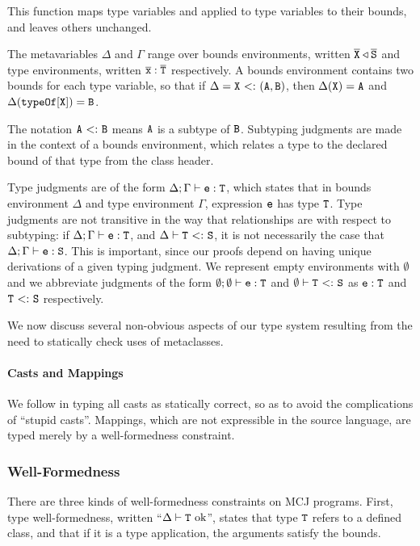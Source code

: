 \documentclass{acm-sigplan}
\begin{document}
This function maps type variables and {} applied to type
variables to their bounds, and leaves others unchanged.

The metavariables $\Delta$ and $\Gamma$ range over bounds
environments, written ${\overline{{\mbox {\tt X}}}} \triangleleft {\overline{{\mbox {\tt S}}}}$ and type environments,
written ${{\overline{{\mbox {\tt x}}}}} : {{\overline{{\mathtt{{T}}}}}}$ respectively.  A bounds environment contains
two bounds for each type variable, so that if $\Delta = \mbox {\tt X} {\ <:\ }
(\mbox {\tt A},\mbox {\tt B})$, then $\Delta(\mbox {\tt X}) = \mbox {\tt A}$ and $\Delta({\mathtt{{typeOf}}\mathtt{{[}}\mbox {\tt X}\mathtt{{]}}}) = \mbox {\tt B}$.

The notation $\mbox {\tt A} {\ <:\ } \mbox {\tt B}$ means $\mbox {\tt A}$ is a subtype of $\mbox {\tt B}$.
Subtyping judgments are made in the context of a bounds environment,
which relates a type to the declared bound of that type from the class
header.

Type judgments are of the form ${\Delta;\Gamma} \vdash {\ensuremath{{\mbox {\tt e}} : {\mathtt{{T}}}}}$, which states
that in bounds environment $\Delta$ and type environment $\Gamma$,
expression $\mbox {\tt e}$ has type $\mathtt{{T}}$.  Type judgments are not transitive in
the way that {} relationships are with respect to
subtyping: if ${\Delta;\Gamma} \vdash {\ensuremath{{\mbox {\tt e}} : {\mathtt{{T}}}}}$, and ${\Delta} \vdash {\ensuremath{{\mathtt{{T}}} {\ <:\ } {\mbox {\tt S}}}}$, it is not necessarily the case that ${\Delta;\Gamma} \vdash {\ensuremath{{\mbox {\tt e}} : {\mbox {\tt S}}}}$.
This is important, since our proofs depend on having unique
derivations of a given typing judgment. We represent empty
environments with $\emptyset$ and we abbreviate judgments of the form
${\emptyset;\emptyset} \vdash {\ensuremath {{\mbox {\tt e}} : {\mathtt{{T}}}}}$ and ${\emptyset} \vdash {\ensuremath {{\mathtt{{T}}} {\ <:\ } {\mbox {\tt S}}}}$ as ${{\mbox {\tt e}} : {\mathtt{{T}}}}$ and ${{\mathtt{{T}}} {\ <:\ } {\mbox {\tt S}}}$ respectively.

We now discuss several non-obvious aspects of our type system
resulting from the need to statically check uses of metaclasses.


\paragraph{Casts and Mappings}
We follow \cite{MixGen} in typing all casts as statically correct, so as to
avoid the complications of ``stupid casts''.  Mappings, which are not
expressible in the source language, are typed merely by a
well-formedness constraint.

\subsubsection{Well-Formedness}

There are three kinds of well-formedness constraints on MCJ
programs.  First, type well-formedness, written ``${\Delta} \vdash {\ensuremath{\mathtt{{T}}}} \mbox{\textrm {\ ok}}$'',
states that type $\mathtt{{T}}$ refers to a defined class, and that if it is a type
application, the arguments satisfy the bounds.
\end{document}
